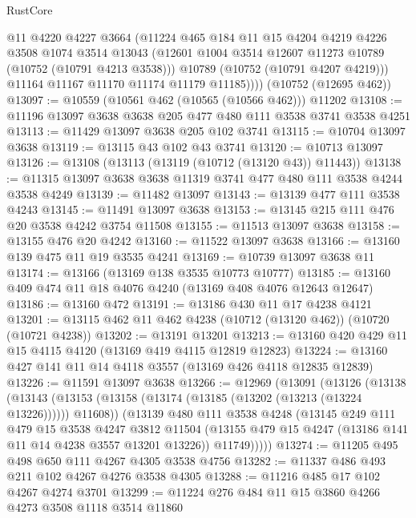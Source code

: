 \begin{lexlean}{RustCore}
\begin{coremodule}
            @11
            @4220
            @4227
            @3664
            (@11224
              @465
              @184
              @11
              @15
              @4204
              @4219
              @4226
              @3508
              @1074
              @3514
              @13043
              (@12601 @1004 @3514 @12607 @11273 @10789 (@10752 (@10791 @4213 @3538)))
              @10789
              (@10752 (@10791 @4207 @4219)))
            @11164
            @11167
            @11170
            @11174
            @11179
            @11185))))
    (@10752 (@12695 @462))
@13097 := @10559 (@10561 @462 (@10565 (@10566 @462))) @11202
@13108 := @11196 @13097 @3638 @3638 @205 @477 @480 @111 @3538 @3741 @3538 @4251
@13113 := @11429 @13097 @3638 @205 @102 @3741
@13115 := @10704 @13097 @3638
@13119 := @13115 @43 @102 @43 @3741
@13120 := @10713 @13097
@13126 := @13108 (@13113 (@13119 (@10712 (@13120 @43)) @11443))
@13138 := @11315 @13097 @3638 @3638 @11319 @3741 @477 @480 @111 @3538 @4244 @3538 @4249
@13139 := @11482 @13097
@13143 := @13139 @477 @111 @3538 @4243
@13145 := @11491 @13097 @3638
@13153 := @13145 @215 @111 @476 @20 @3538 @4242 @3754 @11508
@13155 := @11513 @13097 @3638
@13158 := @13155 @476 @20 @4242
@13160 := @11522 @13097 @3638
@13166 := @13160 @139 @475 @11 @19 @3535 @4241
@13169 := @10739 @13097 @3638 @11
@13174 := @13166 (@13169 @138 @3535 @10773 @10777)
@13185 := @13160 @409 @474 @11 @18 @4076 @4240 (@13169 @408 @4076 @12643 @12647)
@13186 := @13160 @472
@13191 := @13186 @430 @11 @17 @4238 @4121
@13201 := @13115 @462 @11 @462 @4238 (@10712 (@13120 @462)) (@10720 (@10721 @4238))
@13202 := @13191 @13201
@13213 := @13160 @420 @429 @11 @15 @4115 @4120 (@13169 @419 @4115 @12819 @12823)
@13224 := @13160 @427 @141 @11 @14 @4118 @3557 (@13169 @426 @4118 @12835 @12839)
@13226 := @11591 @13097 @3638
@13266 := @12969
    (@13091
      (@13126
        (@13138
          (@13143 (@13153 (@13158 (@13174 (@13185 (@13202 (@13213 (@13224 @13226)))))) @11608))
          (@13139
            @480
            @111
            @3538
            @4248
            (@13145
              @249
              @111
              @479
              @15
              @3538
              @4247
              @3812
              @11504
              (@13155 @479 @15 @4247 (@13186 @141 @11 @14 @4238 @3557 @13201 @13226))
              @11749)))))
@13274 := @11205 @495 @498 @650 @111 @4267 @4305 @3538 @4756
@13282 := @11337 @486 @493 @211 @102 @4267 @4276 @3538 @4305
@13288 := @11216 @485 @17 @102 @4267 @4274 @3701
@13299 := @11224 @276 @484 @11 @15 @3860 @4266 @4273 @3508 @1118 @3514 @11860

\end{coremodule}
\end{lexlean}
